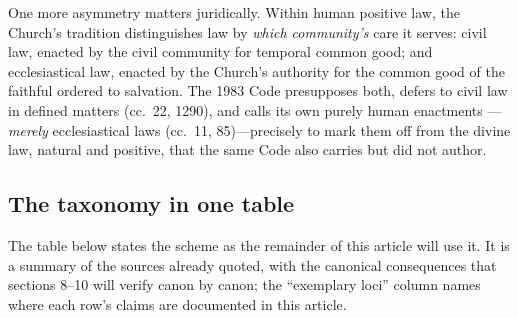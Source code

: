 One more asymmetry matters juridically. Within human positive law, the Church's tradition distinguishes law by \emph{which community's} care it serves: civil law, enacted by the civil community for temporal common good; and ecclesiastical law, enacted by the Church's authority for the common good of the faithful ordered to salvation. The 1983 Code presupposes both, defers to civil law in defined matters (cc.~22, 1290), and calls its own purely human enactments ---\emph{merely} ecclesiastical laws (cc.~11, 85)---precisely to mark them off from the divine law, natural and positive, that the same Code also carries but did not author.

\subsection{The taxonomy in one table}

The table below states the scheme as the remainder of this article will use it. It is a summary of the sources already quoted, with the canonical consequences that sections 8--10 will verify canon by canon; the ``exemplary loci'' column names where each row's claims are documented in this article.

